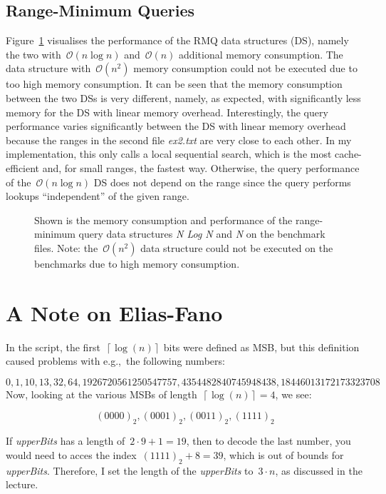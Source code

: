 \documentclass[a4paper,UKenglish,cleveref, autoref, thm-restate]{lipics-v2021}
\newcommand{\eg}{e.g.,\xspace~}
\begin{document}
	\subsection{Range-Minimum Queries}
	Figure~\ref{fig:rmq} visualises the performance of the RMQ data structures (DS), namely the two with~$\mathcal{O}\left(n \log n\right)$ and~$\mathcal{O}\left(n\right)$ additional memory consumption. The data structure with~$\mathcal{O}\left(n^2\right)$ memory consumption could not be executed due to too high memory consumption. It can be seen that the memory consumption between the two DSs is very different, namely, as expected, with significantly less memory for the DS with linear memory overhead. Interestingly, the query performance varies significantly between the DS with linear memory overhead because the ranges in the second file \textit{ex2.txt} are very close to each other. In my implementation, this only calls a local sequential search, which is the most cache-efficient and, for small ranges, the fastest way. Otherwise, the query performance of the~$\mathcal{O}\left(n \log n\right)$ DS does not depend on the range since the query performs lookups ``independent'' of the given range.
	\begin{figure}[htbp]
		\begin{center}
			\resizebox{.9\linewidth}{!}{
				
			}
			\caption{Shown is the memory consumption and performance of the range-minimum query data structures \textit{N Log N} and \textit{N} on the benchmark files. Note: the~$\mathcal{O}\left(n^2\right)$ data structure could not be executed on the benchmarks due to high memory consumption.}
			\label{fig:rmq}
		\end{center}
	\end{figure}
	
	
	
	\appendix
	\section{A Note on Elias-Fano}
	\label{app:sec::ef}
	In the script, the first~$\left\lceil \log\left(n\right)\right\rceil$ bits were defined as MSB, but this definition caused problems with \eg the following numbers:
	
	\begin{equation*}
		0, 1, 10, 13, 32, 64, 1926720561250547757, 4354482840745948438, 18446013172173323708
	\end{equation*}
	Now, looking at the various MSBs of length~$\left\lceil \log\left(n\right)\right\rceil = 4$, we see:
	
	\begin{equation}
		\left(0000\right)_2, \left(0001\right)_2, \left(0011\right)_2, \left(1111\right)_2
	\end{equation}
	
	If \textit{upperBits} has a length of~$2\cdot9+1 = 19$, then to decode the last number, you would need to acces the index~$\left(1111\right)_2 + 8 = 39$, which is out of bounds for \textit{upperBits}. Therefore, I set the length of the \textit{upperBits} to~$3 \cdot n$, as discussed in the lecture.
\end{document}
